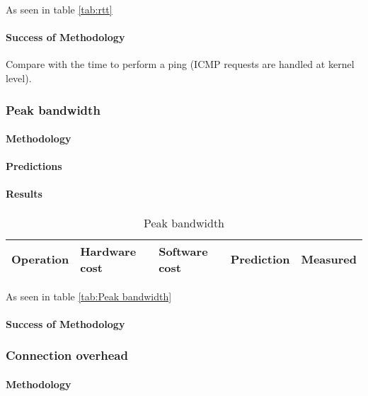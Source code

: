 As seen in table \ref{tab:rtt}
\paragraph{Success of Methodology}

 Compare with the time to perform a ping (ICMP requests are handled at kernel level).






\subsubsection{Peak bandwidth}



\paragraph{Methodology}
\paragraph{Predictions}
\paragraph{Results}
\begin{table}[h]
\begin{center}
\begin{tabular}{| l | l | l | l | l |}
\hline
Operation & Hardware cost & Software cost & Prediction & Measured \\
\hline
\end{tabular}
\end{center}
\caption{Peak bandwidth\label{tab:peak-bandwidth}}
\end{table}

As seen in table \ref{tab:Peak bandwidth}
\paragraph{Success of Methodology}





\subsubsection{Connection overhead}
\paragraph{Methodology}
